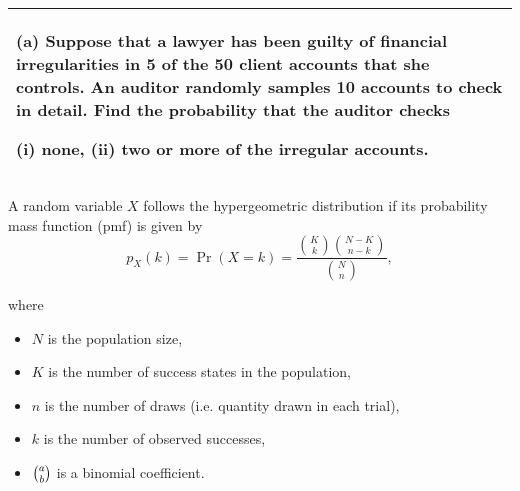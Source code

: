 \documentclass[a4paper,12pt]{article}
\begin{document}
\begin{table}[ht!]
     \centering
     \begin{tabular}{|p{15cm}|}
     \hline        
(a) Suppose that a lawyer has been guilty of financial irregularities in 5 of the 50 client accounts that she controls.  An auditor randomly samples 10 accounts to check in detail.  Find the probability that the auditor checks  
 
(i) none, (ii) two or more of the irregular accounts. 
 \\ \hline
      \end{tabular}
    \end{table}
    
  
\begin{framed}
A random variable 
$ {\displaystyle X} $
 follows the hypergeometric distribution if its probability mass function (pmf) is given by
\[ {\displaystyle p_{X}(k)=\Pr(X=k)={\frac {{\binom {K}{k}}{\binom {N-K}{n-k}}}{\binom {N}{n}}},} \]

where 
\begin{itemize}
\item ${\displaystyle N}$ 
 is the population size,
\item ${\displaystyle K}$ 
 is the number of success states in the population,
\item ${\displaystyle n}$ 
 is the number of draws (i.e. quantity drawn in each trial),
\item ${\displaystyle k}$ 
 is the number of observed successes,
\item ${\textstyle \textstyle {a \choose b}}$ 
 is a binomial coefficient.
\end{itemize}

\end{framed}
\end{document}
